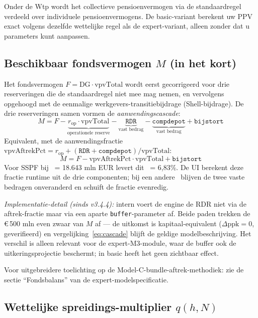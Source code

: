 \documentclass[11pt,a4paper]{article}
\newcommand{\vpvTotal}{\text{vpvTotal}}
\newcommand{\vpvAftrekPct}{\text{vpvAftrekPct}}
\newcommand{\dG}{\text{DG}}
\newcommand{\code}[1]{\texttt{#1}}
\begin{document}
Onder de Wtp wordt het collectieve pensioenvermogen via de standaardregel verdeeld over individuele pensioenvermogens. De basic-variant berekent uw PPV exact volgens dezelfde wettelijke regel als de expert-variant, alleen zonder dat u parameters kunt aanpassen.

\subsection{Beschikbaar fondsvermogen $M$ (in het kort)}

Het fondsvermogen $F = \dG \cdot \vpvTotal$ wordt eerst gecorrigeerd voor drie reserveringen die de standaardregel niet mee mag nemen, en vervolgens opgehoogd met de eenmalige werkgevers-transitiebijdrage (Shell-bijdrage). De drie reserveringen samen vormen de \emph{aanwendingscascade}:
\begin{equation}
M = F - \underbrace{r_{\text{op}} \cdot \vpvTotal}_{\text{operationele reserve}} - \underbrace{\code{RDR}}_{\text{vast bedrag}} - \underbrace{\code{compdepot}}_{\text{vast bedrag}} + \code{bijstort}
\label{eq:cascade}
\end{equation}
Equivalent, met de aanwendingsfractie $\vpvAftrekPct = r_{\text{op}} + (\code{RDR} + \code{compdepot})/\vpvTotal$:
\begin{equation}
M = F - \vpvAftrekPct \cdot \vpvTotal + \code{bijstort}
\end{equation}
Voor SSPF bij \vpvTotal\ = 18.643 mln EUR levert dit \vpvAftrekPct\ = 6,83\%. De UI berekent deze fractie runtime uit de drie componenten; bij een andere \vpvTotal\ blijven de twee vaste bedragen onveranderd en schuift de fractie evenredig.

\emph{Implementatie-detail (sinds v3.4.4):} intern voert de engine de RDR niet via de aftrek-fractie maar via een aparte \code{buffer}-parameter af. Beide paden trekken de €\,500 mln even zwaar van $M$ af --- de uitkomst is kapitaal-equivalent ($\Delta\text{ppk} = 0$, geverifieerd) en vergelijking~\eqref{eq:cascade} blijft de geldige modelbeschrijving. Het verschil is alleen relevant voor de expert-M3-module, waar de buffer ook de uitkeringsprojectie beschermt; in basic heeft het geen zichtbaar effect.

Voor uitgebreidere toelichting op de Model-C-bundle-aftrek-metho\-diek: zie de sectie ``Fondsbalans'' van de expert-modelspecificatie.

\subsection{Wettelijke spreidings-multiplier $q(h, N)$}
\end{document}
